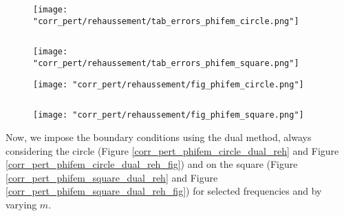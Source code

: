 \begin{minipage}{0.48\linewidth}
	\begin{figure}[H]
		\centering
		\texttt{[image: "corr\_pert/rehaussement/tab\_errors\_phifem\_circle.png"]}
		\label{corr_pert_phifem_circle_reh}
	\end{figure} 
\end{minipage} $\qquad$
\begin{minipage}{0.48\linewidth}
	\begin{figure}[H]
		\centering
		\texttt{[image: "corr\_pert/rehaussement/tab\_errors\_phifem\_square.png"]}
		\label{corr_pert_phifem_square_reh}
	\end{figure} 
\end{minipage}

\begin{minipage}{0.48\linewidth}
	\begin{figure}[H]
		\centering
		\texttt{[image: "corr\_pert/rehaussement/fig\_phifem\_circle.png"]}
		\label{corr_pert_phifem_circle_reh_fig}
	\end{figure} 
\end{minipage} $\qquad$
\begin{minipage}{0.48\linewidth}
	\begin{figure}[H]
		\centering
		\texttt{[image: "corr\_pert/rehaussement/fig\_phifem\_square.png"]}
		\label{corr_pert_phifem_square_reh_fig}
	\end{figure} 
\end{minipage}

Now, we impose the boundary conditions using the dual method, always considering the circle (Figure \ref{corr_pert_phifem_circle_dual_reh} and Figure \ref{corr_pert_phifem_circle_dual_reh_fig}) and on the square (Figure \ref{corr_pert_phifem_square_dual_reh} and Figure \ref{corr_pert_phifem_square_dual_reh_fig}) for selected frequencies and by varying $m$.


